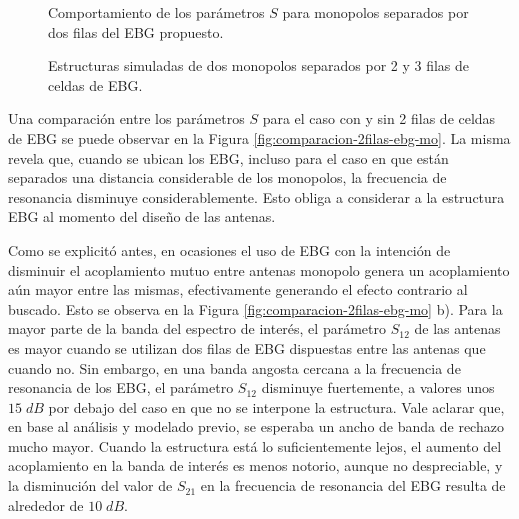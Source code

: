 \begin{figure}[H]
	\centering 
	\hspace{0pt}
	\caption{Comportamiento de los parámetros $S$ para monopolos separados por dos filas del EBG propuesto.}
	\label{fig:parametros-s-2ebg}
\end{figure}

\begin{figure}[H]
	\centering 
	\hspace{0pt}
	\caption{Estructuras simuladas de dos monopolos separados por 2 y 3 filas de celdas de EBG.}
	\label{fig:estructuras2-y-3-ebg-monopolos}
\end{figure} 

Una comparación entre los parámetros $S$ para el caso con y sin 2 filas de celdas de EBG se puede observar en la Figura \ref{fig:comparacion-2filas-ebg-mo}. La misma revela que, cuando se ubican los EBG, incluso para el caso en que están separados una distancia considerable de los monopolos, la frecuencia de resonancia disminuye considerablemente. Esto obliga a considerar a la estructura EBG al momento del diseño de las antenas.

Como se explicitó antes, en ocasiones el uso de EBG con la intención de disminuir el acoplamiento mutuo entre antenas monopolo genera un acoplamiento aún mayor entre las mismas, efectivamente generando el efecto contrario al buscado. Esto se observa en la Figura \ref{fig:comparacion-2filas-ebg-mo} b). Para la mayor parte de la banda del espectro de interés, el parámetro $S_{12}$ de las antenas es mayor cuando se utilizan dos filas de EBG dispuestas entre las antenas que cuando no. Sin embargo, en una banda angosta cercana a la frecuencia de resonancia de los EBG, el parámetro $S_{12}$ disminuye fuertemente, a valores unos $15\; dB$ por debajo del caso en que no se interpone la estructura. Vale aclarar que, en base al análisis y modelado previo, se esperaba un ancho de banda de rechazo mucho mayor. Cuando la estructura está lo suficientemente lejos, el aumento del acoplamiento en la banda de interés es menos notorio, aunque no despreciable, y la disminución del valor de $S_{21}$ en la frecuencia de resonancia del EBG resulta de alrededor de $10\; dB$.

